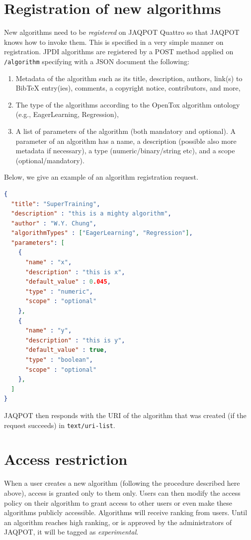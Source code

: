 \section{Registration of new algorithms}
New algorithms need to be \textit{registered} on JAQPOT Quattro
so that JAQPOT knows how to invoke them. This is specified in 
a very simple manner on registration. JPDI algorithms
are registered by a POST method applied on \texttt{/algorithm}
specifying with a JSON document the following:
\begin{enumerate}
 \item Metadata of the algorithm such as its title, description,
 authors, link(s) to BibTeX entry(ies), comments, a copyright notice,
 contributors, and more,
 \item The type of the algorithms according to the OpenTox algorithm
 ontology (e.g., EagerLearning, Regression),
 \item A list of parameters of the algorithm (both mandatory and optional).
 A parameter of an algorithm has a name, a description (possible also more
 metadata if necessary), a type (numeric/binary/string etc), and
 a scope (optional/mandatory).
\end{enumerate}
Below, we give an example of an algorithm registration request.

\begin{lstlisting}[language=json]
{
  "title": "SuperTraining",
  "description" : "this is a mighty algorithm",
  "author" : "W.Y. Chung",
  "algorithmTypes" : ["EagerLearning", "Regression"],
  "parameters": [
    {
      "name" : "x",
      "description" : "this is x",
      "default_value" : 0.045,
      "type" : "numeric",
      "scope" : "optional"
    },
    {
      "name" : "y",
      "description" : "this is y",
      "default_value" : true,
      "type" : "boolean",
      "scope" : "optional"
    },
  ]
} 
\end{lstlisting}

JAQPOT then responds with the URI of the algorithm that 
was created (if the request succeeds) in \texttt{text/uri-list}.

\section{Access restriction}
When a user creates a new algorithm (following the procedure described here
above), access is granted only to them only. Users can then modify the access
policy on their algorithm to grant access to other users or even make 
these algorithms publicly accessible. Algorithms will receive ranking
from users. Until an algorithm reaches high ranking, or is approved by
the administrators of JAQPOT, it will be tagged as \textit{experimental}.